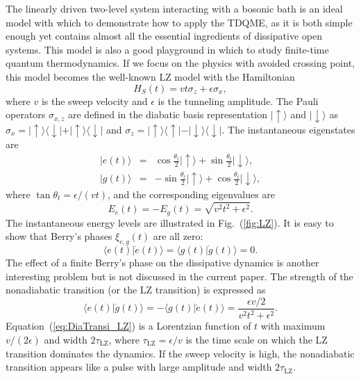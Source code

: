 \documentclass[english,nofootinbib, pra, twocolumn,superscriptaddress]{revtex4-1}
\begin{document}
The linearly driven two-level system interacting with a bosonic bath
is an ideal model with which to demonstrate how to apply the TDQME,
as it is both simple enough yet contains almost all the essential
ingredients of dissipative open systems. This model is also a good
playground in which to study finite-time quantum thermodynamics.
If we focus on the physics with avoided crossing point, this model becomes the well-known LZ model with the Hamiltonian
\begin{equation}
H_{S}(t)=vt\sigma_{z}+\epsilon\sigma_{x},\label{eq:Hs}
\end{equation}
where $v$ is the sweep velocity and $\epsilon$ is the tunneling
amplitude. The Pauli operators $\sigma_{x,z}$ are defined in the
diabatic basis representation $\vert\uparrow\rangle$ and $\vert\downarrow\rangle$
as $\sigma_{x}=\vert\uparrow\rangle\langle\downarrow\vert+\vert\uparrow\rangle\langle\downarrow\vert$
and $\sigma_{z}=\vert\uparrow\rangle\langle\uparrow\vert-\vert\downarrow\rangle\langle\downarrow\vert$.
The instantaneous eigenstates are 
\begin{eqnarray}
\vert e(t)\rangle & = & \cos\frac{\theta_{t}}{2}\vert\uparrow\rangle+\sin\frac{\theta_{t}}{2}\vert\downarrow\rangle,\label{eq:ES+}\\
\vert g(t)\rangle & = & -\sin\frac{\theta_{t}}{2}\vert\uparrow\rangle+\cos\frac{\theta_{t}}{2}\vert\downarrow\rangle,\label{eq:ES-}
\end{eqnarray}
where $\tan\theta_{t}=\epsilon/(vt)$, and the corresponding eigenvalues are
\begin{equation}
E_{e}(t)=-E_{g}(t)=\sqrt{v^{2}t^{2}+\epsilon^{2}}.\label{eq:EV}
\end{equation}
The instantaneous energy levels are illustrated in Fig.~(\ref{fig:LZ}).
It is easy to show that Berry's phases $\xi_{e,g}(t)$ are all zero:
\begin{equation}
\langle e(t)\vert\dot{e}(t)\rangle=\langle g(t)\vert\dot{g}(t)\rangle=0.\label{eq:BF_LZ}
\end{equation}
The effect of a finite Berry's phase on the dissipative dynamics is
another interesting problem \citep{2005.Gefen,2007.Palma} but is
not discussed in the current paper. The strength of the nonadiabatic transition
(or the LZ transition) is expressed as
\begin{equation}
\langle e(t)\vert\dot{g}(t)\rangle=-\langle g(t)\vert\dot{e}(t)\rangle=\frac{\epsilon v/2}{v^{2}t^{2}+\epsilon^{2}}.\label{eq:DiaTransi_LZ}
\end{equation}
Equation~(\ref{eq:DiaTransi_LZ}) is a Lorentzian function
of $t$ with maximum $v/(2\epsilon)$ and width $2\tau_{\text{LZ}}$,
where $\tau_{\text{LZ}}=\epsilon/v$ is the time scale on which
the LZ transition dominates the dynamics. If the sweep velocity is
high, the nonadiabatic transition appears like a pulse with
large amplitude and width $2\tau_{\text{LZ}}$.
\end{document}
